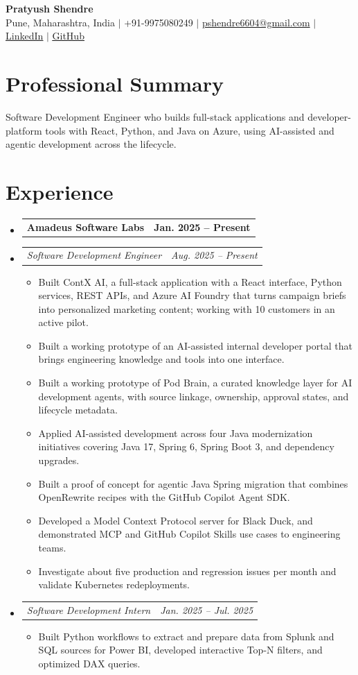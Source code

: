 \documentclass[a4paper,11pt]{article}
\makeatletter
\newcommand{\bulletpoint}[1]{\item\small{#1}}
\newcommand{\company}[2]{\item\begin{tabularx}{\textwidth}{@{}Xr@{}}\textbf{#1}& \textbf{#2}\end{tabularx}\vspace{-4pt}}
\newcommand{\role}[2]{\item\begin{tabularx}{\textwidth}{@{}Xr@{}}\textit{\small #1}&\textit{\small #2}\end{tabularx}\vspace{-5pt}}
\makeatother
\begin{document}
\begin{center}
  {\Large\bfseries Pratyush Shendre}\\[2pt]
  \small Pune, Maharashtra, India $|$ +91-9975080249 $|$
  \href{mailto:pshendre6604@gmail.com}{pshendre6604@gmail.com} $|$
  \href{https://www.linkedin.com/in/pratyush-shendre-2256a7223/}{\underline{LinkedIn}} $|$
  \href{https://github.com/PratyushS04}{\underline{GitHub}}
\end{center}

\section{Professional Summary}
\small Software Development Engineer who builds full-stack applications and developer-platform tools with React, Python, and Java on Azure, using AI-assisted and agentic development across the lifecycle.

\section{Experience}
\begin{itemize}[leftmargin=0in,label={}]
  \company{Amadeus Software Labs}{Jan. 2025 -- Present}
  \role{Software Development Engineer}{Aug. 2025 -- Present}
  \begin{itemize}
    \bulletpoint{Built ContX AI, a full-stack application with a React interface, Python services, REST APIs, and Azure AI Foundry that turns campaign briefs into personalized marketing content; working with 10 customers in an active pilot.}
    \bulletpoint{Built a working prototype of an AI-assisted internal developer portal that brings engineering knowledge and tools into one interface.}
    \bulletpoint{Built a working prototype of Pod Brain, a curated knowledge layer for AI development agents, with source linkage, ownership, approval states, and lifecycle metadata.}
    \bulletpoint{Applied AI-assisted development across four Java modernization initiatives covering Java 17, Spring 6, Spring Boot 3, and dependency upgrades.}
    \bulletpoint{Built a proof of concept for agentic Java Spring migration that combines OpenRewrite recipes with the GitHub Copilot Agent SDK.}
    \bulletpoint{Developed a Model Context Protocol server for Black Duck, and demonstrated MCP and GitHub Copilot Skills use cases to engineering teams.}
    \bulletpoint{Investigate about f{}ive production and regression issues per month and validate Kubernetes redeployments.}
  \end{itemize}
  \role{Software Development Intern}{Jan. 2025 -- Jul. 2025}
  \begin{itemize}
    \bulletpoint{Built Python workf{}lows to extract and prepare data from Splunk and SQL sources for Power BI, developed interactive Top-N f{}ilters, and optimized DAX queries.}
  \end{itemize}
\end{itemize}
\end{document}

